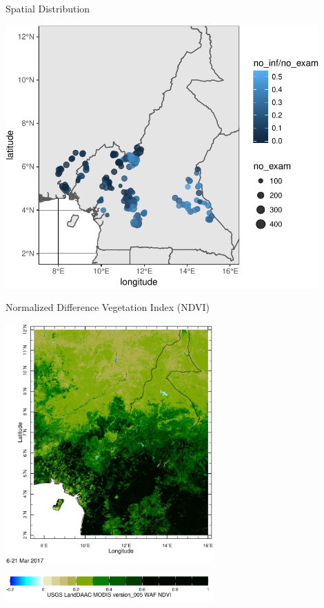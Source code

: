 \documentclass[11pt,ignorenonframetext,]{beamer}
\begin{document}
\begin{frame}{Spatial Distribution}
\protect\hypertarget{spatial-distribution}{}

\begin{center}\includegraphics[width=0.9\textwidth]{Lec20_files/figure-beamer/unnamed-chunk-3-1} \end{center}

\end{frame}

\begin{frame}[t]{Normalized Difference Vegetation Index (NDVI)}
\protect\hypertarget{normalized-difference-vegetation-index-ndvi}{}

\vspace{-2.5mm}

\begin{center}\includegraphics[width=0.6\textwidth]{figs/ndvi_cameroon} \end{center}

\begin{center}\includegraphics[width=0.6\textwidth]{figs/ndvi_cameroon_scale} \end{center}

\end{frame}
\end{document}
